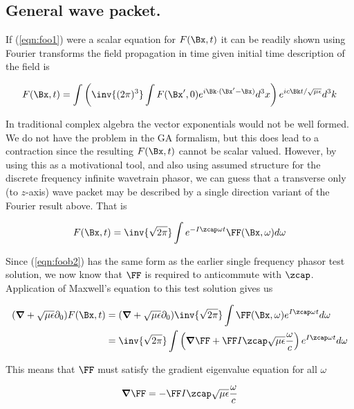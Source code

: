 \subsection{General wave packet.}

If (\ref{eqn:foo1}) were a scalar equation for $F(\Bx,t)$ it can be readily shown using Fourier transforms the field propagation in time given initial time description of the field is 

\begin{align}\label{eqn:foob1}
F(\Bx, t) = \int \left( \inv{(2\pi)^3} \int F(\Bx', 0) e^{i\Bk \cdot (\Bx' -\Bx)} d^3 x \right) e^{i c \Bk t/ \sqrt{\mu\epsilon}} d^3 k
\end{align}

In traditional complex algebra the vector exponentials would not be well formed.  We do not have the problem in the GA formalism, but this does lead to a contraction since the resulting $F(\Bx,t)$ cannot be scalar valued.  However, by using this as a motivational tool, and 
also using assumed structure for the discrete frequency infinite wavetrain phasor, we can guess that a transverse only (to $z$-axis) wave packet may be described by a single direction variant of the Fourier result above.  That is

\begin{align}\label{eqn:foob2}
F(\Bx, t) = 
\inv{\sqrt{2\pi}} \int 
e^{-I \zcap \omega t} 
\FF(\Bx, \omega)
d\omega
\end{align}

Since (\ref{eqn:foob2}) has the same form as the earlier single frequency phasor test solution, we now know that $\FF$ is required to anticommute with $\zcap$.  Application of Maxwell's equation to this test solution gives us

\begin{align*}
(\spacegrad +\sqrt{\mu\epsilon} \partial_0) F(\Bx,t) &=
(\spacegrad +\sqrt{\mu\epsilon} \partial_0) 
\inv{\sqrt{2\pi}} \int 
\FF(\Bx, \omega)
e^{I \zcap \omega t} 
d\omega \\
&=
\inv{\sqrt{2\pi}}\int
\left(\spacegrad \FF + \FF I \zcap \sqrt{\mu\epsilon} \frac{\omega}{c}\right) 
e^{I \zcap \omega t} 
d\omega
\end{align*}

This means that $\FF$ must satisfy the gradient eigenvalue equation for all $\omega$

\begin{align}\label{eqn:foob4}
\spacegrad \FF = -\FF I \zcap \sqrt{\mu\epsilon} \frac{\omega}{c} 
\end{align}

